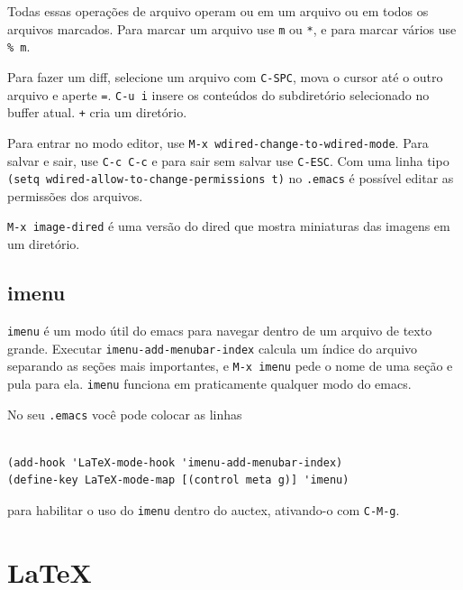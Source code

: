 \documentclass[12pt,brazil]{book}
\begin{document}
Todas essas operações de arquivo operam ou em um arquivo ou em todos
os arquivos marcados. Para marcar um arquivo use \texttt{m} ou
\texttt{*}, e para marcar vários use \texttt{\% m}.

Para fazer um diff, selecione um arquivo com \texttt{C-SPC}, mova o
cursor até o outro arquivo e aperte \texttt{=}. \texttt{C-u i} insere
os conteúdos do subdiretório selecionado no buffer atual. \texttt{+}
cria um diretório.

Para entrar no modo editor, use \texttt{M-x
  wdired-change-to-wdired-mode}. Para salvar e sair, use \texttt{C-c
  C-c} e para sair sem salvar use \texttt{C-ESC}. Com uma linha tipo
\texttt{(setq wdired-allow-to-change-permissions t)} no
\texttt{.emacs} é possível editar as permissões dos arquivos.

\texttt{M-x image-dired} é uma versão do dired que mostra miniaturas
das imagens em um diretório.


\section{imenu}
\label{sec:imenu}

\texttt{imenu} é um modo útil do emacs para navegar dentro de um
arquivo de texto grande. Executar \texttt{imenu-add-menubar-index}
calcula um índice do arquivo separando as seções mais importantes, e
\texttt{M-x imenu} pede o nome de uma seção e pula para
ela. \texttt{imenu} funciona em praticamente qualquer modo do emacs.

No seu \texttt{.emacs} você pode colocar as linhas
\begin{verbatim}

(add-hook 'LaTeX-mode-hook 'imenu-add-menubar-index)
(define-key LaTeX-mode-map [(control meta g)] 'imenu)

\end{verbatim}
para habilitar o uso do \texttt{imenu} dentro do auctex, ativando-o
com \texttt{C-M-g}.

\chapter{LaTeX}
\label{cha:latex}
\end{document}
